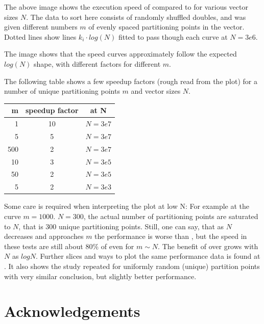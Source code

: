 The above image shows the execution speed of  compared to  for various vector sizes $N$.
The data to sort here consists of randomly shuffled doubles, and  was given different numbers $m$ of evenly spaced partitioning points in the vector. Dotted lines show lines $k_i \cdot log(N)$ fitted to pass though each curve at $N=3e6$.

The image shows that the speed curves approximately follow the expected $log(N)$ shape, with different factors for different $m$.

The following table shows a few speedup factors (rough read from the plot) for a number of unique partitioning points $m$ and vector sizes $N$.

\begin{center}
\begin{tabular}{|r|c|c|} %
  \hline 
  \textbf{m} & \textbf{speedup factor} & \textbf{at N}\\
  \hline 
1 & 10 & $N=3e7$\\
5 & 5 & $N=3e7$\\
500 & 2 & $N=3e7$\\
\hline
10 & 3 & $N=3e5$\\
50 & 2 & $N=3e5$\\
\hline
5 & 2 & $N=3e3$\\
  \hline 
\end{tabular}
\end{center}

Some care is required when interpreting the plot at low N: For example at the curve $m=1000$. $N=300$, the actual number of partitioning points are saturated to $N$, that is $300$ unique partitioning points. Still, one can say, that as $N$ decreases and approaches $m$ the performance is worse than , but the speed in these tests are still about $80\%$ of  even for $m \sim N$. The benefit of  over  grows with $N$ as $log N$. Further slices and ways to plot the same performance data is found at \cite{p2375RefImpl}. It also shows the study repeated for uniformly random (unique) partition points with very similar conclusion, but slightly better performance.


\section*{Acknowledgements}

